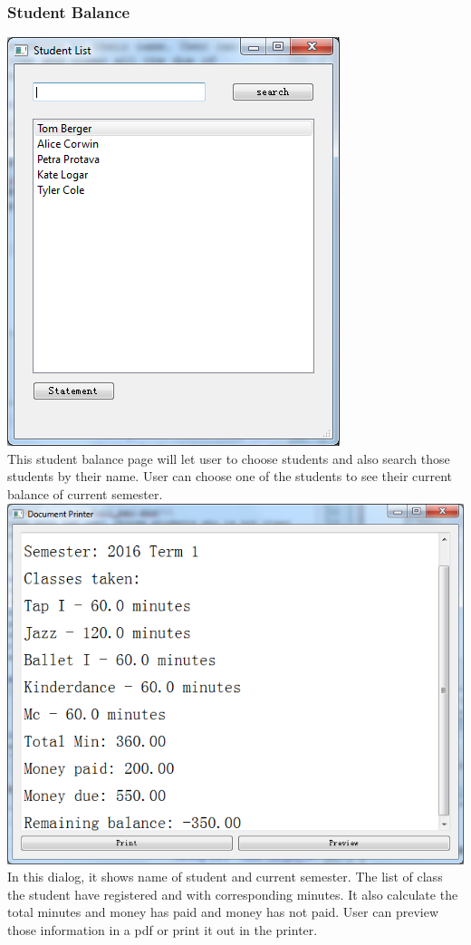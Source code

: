 \subsubsection{Student Balance}
\includegraphics[scale=0.5]{pics/balance_main.png}\\
This student balance page will let user to choose students and also search those students by their name. User can choose one of the students to see their current balance of current semester. \\
\includegraphics[scale=0.5]{pics/balance_dialog.png}\\
In this dialog, it shows name of student and current semester. The list of class the student have registered and with corresponding minutes. It also calculate the total minutes and money has paid and money has not paid. User can preview those information in a pdf or print it out in the printer.

